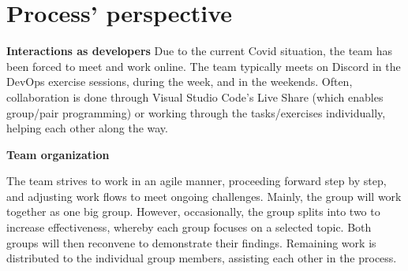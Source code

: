 \section{Process' perspective}

\textbf{Interactions as developers}\newline
  Due to the current Covid situation, the team has been forced to meet and work online. The team typically meets on Discord in the DevOps
  exercise sessions, during the week, and in the weekends. Often, collaboration is done through Visual Studio Code's Live Share (which enables group/pair programming) or working through the tasks/exercises individually, helping each other along the way. 
  \newline
 
\textbf{Team organization}\newline

  The team strives to work in an agile manner, proceeding forward step by step, and adjusting work flows to meet ongoing challenges. Mainly, the group will work together as one big group. 
  However, occasionally, the group splits into two to increase effectiveness, whereby each group focuses on a selected topic. Both groups will then reconvene to demonstrate their findings. Remaining work is distributed to the individual group members, assisting each other in the process.


